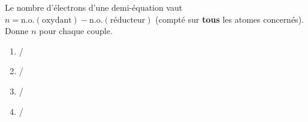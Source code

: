 \documentclass[11pt,a4paper]{article}
\begin{document}
\begin{exo}
Le nombre d'électrons d'une demi-équation vaut $n=\mathrm{n.o.}(\text{oxydant})-\mathrm{n.o.}
(\text{réducteur})$ (compté sur \textbf{tous} les atomes concernés). Donne $n$ pour chaque couple.
\begin{enumerate}[label=\alph*)]
  \item {}/
  \item {}/
  \item {}/
  \item {}/
\end{enumerate}
\end{exo}
\end{document}
